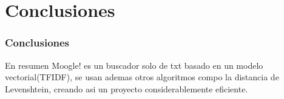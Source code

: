 \documentclass{beamer}
\begin{document}
\section{Conclusiones}

\begin{frame}
	\frametitle{Conclusiones}
	\begin{minipage}{10cm}
		En resumen Moogle! es un buscador solo de txt basado en un modelo vectorial(TFIDF), se usan ademas otros algoritmos compo la distancia de Levenshtein, creando asi un proyecto considerablemente eficiente.
	\end{minipage}
\end{frame}
\end{document}
